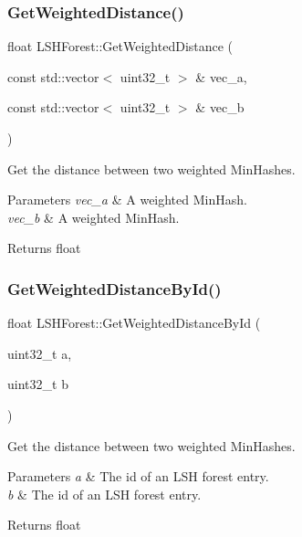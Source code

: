 \subsubsection{\texorpdfstring{Get\+Weighted\+Distance()}{GetWeightedDistance()}}
{\footnotesize\ttfamily float L\+S\+H\+Forest\+::\+Get\+Weighted\+Distance (\begin{DoxyParamCaption}\item[{const std\+::vector$<$ uint32\+\_\+t $>$ \&}]{vec\+\_\+a,  }\item[{const std\+::vector$<$ uint32\+\_\+t $>$ \&}]{vec\+\_\+b }\end{DoxyParamCaption})}



Get the distance between two weighted Min\+Hashes. 


\begin{DoxyParams}{Parameters}
{\em vec\+\_\+a} & A weighted Min\+Hash. \\
\hline
{\em vec\+\_\+b} & A weighted Min\+Hash. \\
\hline
\end{DoxyParams}
\begin{DoxyReturn}{Returns}
float 
\end{DoxyReturn}
\mbox{\label{classLSHForest_a72b5a201bc8c409c0c5742587988ba85}} 
\subsubsection{\texorpdfstring{Get\+Weighted\+Distance\+By\+Id()}{GetWeightedDistanceById()}}
{\footnotesize\ttfamily float L\+S\+H\+Forest\+::\+Get\+Weighted\+Distance\+By\+Id (\begin{DoxyParamCaption}\item[{uint32\+\_\+t}]{a,  }\item[{uint32\+\_\+t}]{b }\end{DoxyParamCaption})}



Get the distance between two weighted Min\+Hashes. 


\begin{DoxyParams}{Parameters}
{\em a} & The id of an L\+SH forest entry. \\
\hline
{\em b} & The id of an L\+SH forest entry. \\
\hline
\end{DoxyParams}
\begin{DoxyReturn}{Returns}
float 
\end{DoxyReturn}
\mbox{\label{classLSHForest_af7cbc237713af39831aeab21541dafcf}} 
